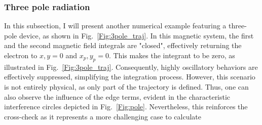 \subsubsection{Three pole radiation}
    In this subsection, I will present another numerical example featuring a three-pole device, as shown in Fig.~\ref{Fig:3pole_traj}. In this magnetic system, the first and the second magnetic field integrals are "closed", effectively returning the electron to $x, y = 0$ and $x_p, y_p = 0$. This makes the integrant to be zero, as illustrated in Fig.~\ref{Fig:3pole_traj}. Consequently, highly oscillatory behaviors are effectively suppressed, simplifying the integration process. However, this scenario is not entirely physical, as only part of the trajectory is defined. Thus, one can also observe the influence of the edge terms, evident in the characteristic interference circles depicted in Fig.~\ref{Fig:pole}. Nevertheless, this reinforces the cross-check as it represents a more challenging case to calculate

